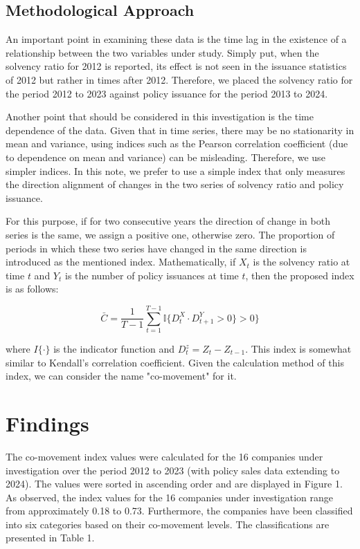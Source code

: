 \documentclass[twoside]{article}
\begin{document}
\subsection{Methodological Approach}

An important point in examining these data is the time lag in the existence of a relationship between the two variables under study. Simply put, when the solvency ratio for 2012 is reported, its effect is not seen in the issuance statistics of 2012 but rather in times after 2012. Therefore, we placed the solvency ratio for the period 2012 to 2023 against policy issuance for the period 2013 to 2024.

Another point that should be considered in this investigation is the time dependence of the data. Given that in time series, there may be no stationarity in mean and variance, using indices such as the Pearson correlation coefficient (due to dependence on mean and variance) can be misleading. Therefore, we use simpler indices. In this note, we prefer to use a simple index that only measures the direction alignment of changes in the two series of solvency ratio and policy issuance.

For this purpose, if for two consecutive years the direction of change in both series is the same, we assign a positive one, otherwise zero. The proportion of periods in which these two series have changed in the same direction is introduced as the mentioned index. Mathematically, if $X_t$ is the solvency ratio at time $t$ and $Y_t$ is the number of policy issuances at time $t$, then the proposed index is as follows:

\begin{equation}
\bar{C} = \frac{1}{T-1}\sum_{t=1}^{T-1} \mathbb{I}\{D_t^X \cdot D_{t+1}^Y > 0\} > 0 \}
\end{equation}

where $I\{\cdot\}$ is the indicator function and $D_t^z=Z_t-Z_{t-1}$. This index is somewhat similar to Kendall's correlation coefficient. Given the calculation method of this index, we can consider the name "co-movement" for it.


\section{Findings}

The co-movement index values were calculated for the 16 companies under investigation over the period 2012 to 2023 (with policy sales data extending to 2024). The values were sorted in ascending order and are displayed in Figure 1. As observed, the index values for the 16 companies under investigation range from approximately 0.18 to 0.73. Furthermore, the companies have been classified into six categories based on their co-movement levels. The classifications are presented in Table 1.
\end{document}
